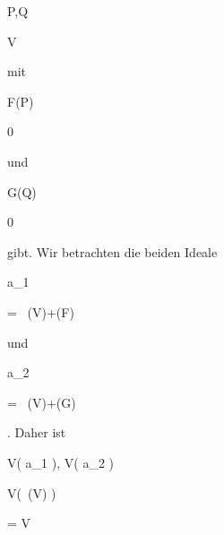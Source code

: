 {{\mavergleichskette


{\vergleichskette


{ P,Q
}


{ \in }{ V
}


{  }{
}


{    }{
}


{   }{
}


}
{}{}{}
mit


\mavergleichskette


{\vergleichskette


{ F(P)
}


{ \neq }{ 0
}


{  }{
}


{    }{
}


{   }{
}


}
{}{}{}
und


\mavergleichskette


{\vergleichskette


{ G(Q)
}


{ \neq }{ 0
}


{  }{
}


{    }{
}


{   }{
}


}
{}{}{}
gibt. Wir betrachten die beiden Ideale


\mavergleichskette


{\vergleichskette


{ {\mathfrak a}_1
}


{ = }{ \, (V)+(F)
}


{  }{
}


{    }{
}


{   }{
}


}
{}{}{}
und


\mavergleichskette


{\vergleichskette


{ {\mathfrak a}_2
}


{ = }{  \, (V)+(G)
}


{  }{
}


{    }{
}


{   }{
}


}
{}{}{.}
Daher ist


\mavergleichskettedisp


{\vergleichskette


{ V( {\mathfrak a}_1 ), V( {\mathfrak a}_2 )
}


{ \subseteq} { V(\, (V)  )
}


{ =} { V
}


}}}

